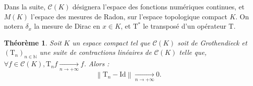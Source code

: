 \documentclass{article}
\theoremstyle{plain}
\newtheorem*{theorem*}{Théorème}
\begin{document}
Dans la suite, $\mathscr{C}(K)$ désignera l'espace des fonctions numériques continues, et $M(K)$ l'espace des mesures de Radon, sur l'espace topologique compact $K$. On notera $\delta_{x}$ la mesure de Dirac en $x \in K$, et $\mathrm{T}^{*}$ le transposé d'un opérateur $\mathrm{T}$.

\begin{theorem*}
	Soit $K$ un espace compact tel que $\mathscr{C}(K)$ soit de Grothendieck et $\left(\mathrm{T}_{n}\right)_{n \in \mathbb{N}}$ une suite de contractions linéaires de $\mathscr{C}(K)$ telle que, $\forall f \in \mathscr{C}(K), \mathrm{T}_{n} f \underset{n \to + \infty}{\longrightarrow} f$.
	Alors :
	\begin{equation*}
		\left\|\mathrm{T}_{n}-\mathrm{Id}\right\|\underset{n \to + \infty}{\longrightarrow}0.
	\end{equation*}
\end{theorem*}
\end{document}
